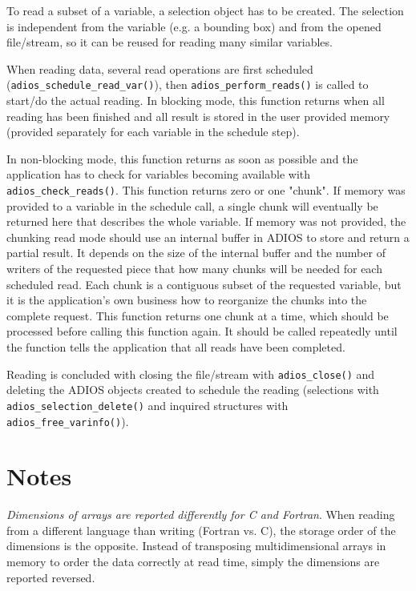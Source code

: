 To read a subset of a variable, a selection object has to be created. The selection is independent from the variable (e.g. a bounding box) and from the opened file/stream, so it can be reused for reading many similar variables. 

When reading data, several read operations are first scheduled (\verb+adios_schedule_read_var()+), then \verb+adios_perform_reads()+ is called to start/do the actual reading. In blocking mode, this function returns when all reading has been finished and all result is stored in the user provided memory (provided separately for each variable in the schedule step). 

In non-blocking mode, this function returns as soon as possible and the application has to check for variables becoming available with \verb+adios_check_reads()+. This function returns zero or one "chunk".
If memory was provided to a variable in the schedule call, a single chunk will eventually be returned here that describes the whole variable. If memory was not provided, the chunking read mode should use an internal buffer in ADIOS to store and return a partial result. It depends on the size of the internal buffer and the number of writers of the requested piece that how many chunks will be needed for each scheduled read. Each chunk is a contiguous subset of the requested variable, but it is the application's own business how to reorganize the chunks into the complete request. This function returns one chunk at a time, which should be processed before calling this function again. It should be called repeatedly until the function tells the application that all reads have been completed.

Reading is concluded with closing the file/stream with \verb+adios_close()+ and deleting the ADIOS objects created to schedule the reading (selections with \verb+adios_selection_delete()+ and inquired structures with \verb+adios_free_varinfo()+).

\section{Notes}

\emph{Dimensions of arrays are reported differently for C and Fortran}.
When reading from a different language than writing (Fortran vs. C), 
the storage order of the dimensions 
is the opposite. Instead of transposing multidimensional arrays in memory to order 
the data correctly at read time, simply the dimensions are reported reversed. 

